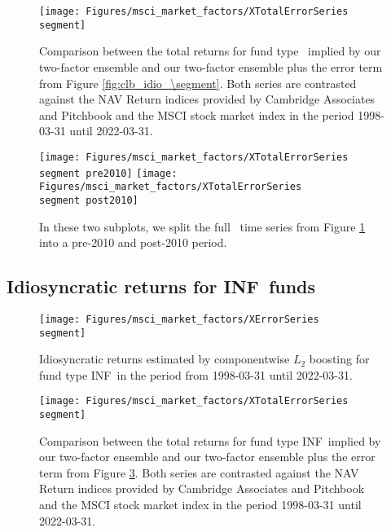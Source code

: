 \begin{figure}[H]
	\centering
	\texttt{[image: Figures/msci\_market\_factors/XTotalErrorSeries\\segment]}
	\caption{
		Comparison between the total returns for fund type \segment \ implied by our two-factor ensemble and our two-factor ensemble plus the error term from Figure \ref{fig:clb_idio_\segment}.
		Both series are contrasted against the NAV Return indices provided by Cambridge Associates and Pitchbook and the MSCI stock market index in the period 1998-03-31 until 2022-03-31.
	}
	\label{fig:clb_total_\segment}
\end{figure}

\begin{figure}[H]
	\centering
	\texttt{[image: Figures/msci\_market\_factors/XTotalErrorSeries\\segment pre2010]}
	\texttt{[image: Figures/msci\_market\_factors/XTotalErrorSeries\\segment post2010]}
	\caption{
		In these two subplots, we split the full \segment \ time series from Figure \ref{fig:clb_total_\segment} into a pre-2010 and post-2010 period.
	}
	\label{fig:clb_pre_post_2010_\segment}
\end{figure}


\renewcommand{\segment}{INF}

\subsection{Idiosyncratic returns for \segment \ funds}
\label{sec:errors_\segment}

\begin{figure}[H]
	\centering
	\texttt{[image: Figures/msci\_market\_factors/XErrorSeries\\segment]}
	\caption{Idiosyncratic returns estimated by componentwise $L_2$ boosting for fund type \segment \ in the period from 1998-03-31 until 2022-03-31.}
	\label{fig:clb_idio_\segment}
\end{figure}

\begin{figure}[H]
	\centering
	\texttt{[image: Figures/msci\_market\_factors/XTotalErrorSeries\\segment]}
	\caption{
		Comparison between the total returns for fund type \segment \ implied by our two-factor ensemble and our two-factor ensemble plus the error term from Figure \ref{fig:clb_idio_\segment}.
		Both series are contrasted against the NAV Return indices provided by Cambridge Associates and Pitchbook and the MSCI stock market index in the period 1998-03-31 until 2022-03-31.
	}
	\label{fig:clb_total_\segment}
\end{figure}

